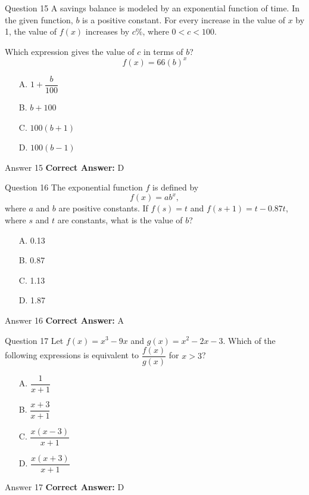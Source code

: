 \documentclass{beamer}
\begin{document}
\begin{frame}{Question 15}
\small
A savings balance is modeled by an exponential function of time. In the given function, \(b\) is a positive constant. For every increase in the value of \(x\) by 1, the value of \(f(x)\) increases by \(c\%\), where \(0 < c < 100\).

Which expression gives the value of \(c\) in terms of \(b\)?
\[
f(x) = 66(b)^x
\]
\vspace{0.35cm}
\begin{enumerate}
    \item[A.] \(1 + \dfrac{b}{100}\)
    \item[B.] \(b + 100\)
    \item[C.] \(100(b + 1)\)
    \item[D.] \(100(b - 1)\)
\end{enumerate}
\end{frame}
\begin{frame}{Answer 15}
\small
\textbf{Correct Answer:} D
\end{frame}

\begin{frame}{Question 16}
\small
The exponential function \(f\) is defined by
\[
f(x) = ab^x,
\]
where \(a\) and \(b\) are positive constants.
If \(f(s) = t\) and \(f(s + 1) = t - 0.87t\), where \(s\) and \(t\) are constants, what is the value of \(b\)?
\vspace{0.35cm}
\begin{enumerate}
    \item[A.] 0.13
    \item[B.] 0.87
    \item[C.] 1.13
    \item[D.] 1.87
\end{enumerate}
\end{frame}
\begin{frame}{Answer 16}
\small
\textbf{Correct Answer:} A
\end{frame}

\begin{frame}{Question 17}
\small
Let \(f(x) = x^3 - 9x\) and \(g(x) = x^2 - 2x - 3\). Which of the following expressions is equivalent to \(\dfrac{f(x)}{g(x)}\) for \(x > 3\)?
\vspace{0.35cm}
\begin{enumerate}
    \item[A.] $\dfrac{1}{x + 1}$
    \item[B.] $\dfrac{x + 3}{x + 1}$
    \item[C.] $\dfrac{x(x - 3)}{x + 1}$
    \item[D.] $\dfrac{x(x + 3)}{x + 1}$
\end{enumerate}
\end{frame}
\begin{frame}{Answer 17}
\small
\textbf{Correct Answer:} D
\end{frame}
\end{document}
